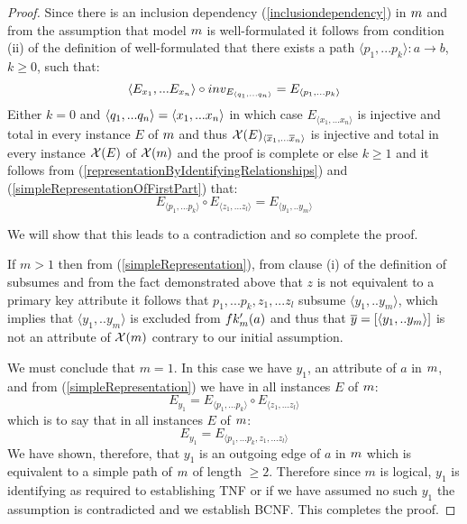 \begin{proof}
Since there is an inclusion dependency (\ref{inclusiondependency}) in ${m}$ and from the assumption that  model
${m}$ is well-formulated it follows
 from condition (ii) of the definition of well-formulated  that there exists
a path $\langle p_1,...p_k \rangle:a \rightarrow b$, $k \geq 0$, such that:
\begin{equation}
\label{simpleRepresentationOfFirstPart}
\langle E_{x_1},...E_{x_n} \rangle \circ inv_{E_{\langle q_1,...q_n\rangle}} = E_{\langle p_1,...p_k \rangle}
\end{equation}
\noindent Either $k=0$ and $\langle q_1,...q_n\rangle = \langle x_1,...x_n \rangle$ in which case $E_{\langle x_1,...x_n \rangle}$ is
injective and total in every instance $E$ of ${m}$ and thus $\mathcal{X}(E)_{\langle \overline{x}_1,...\overline{x}_n \rangle}$ is
injective and total in every instance $\mathcal{X}(E)$ of $\mathcal{X}({m})$ and the proof is complete 
\noindent or else $k \geq 1$ and it follows from (\ref{representationByIdentifyingRelationships}) and (\ref{simpleRepresentationOfFirstPart}) that:
\begin{equation} 
\label{simpleRepresentation}
 E_{\langle p_1,...p_k \rangle} \circ E_{\langle z_1,...z_l \rangle} = E_{\langle y_1,..y_m \rangle} 
\end{equation}


We will show that this leads to a contradiction and so complete the proof. 

If $m >1$ then
 from  (\ref{simpleRepresentation}),
from clause (i) of the definition of subsumes and from the fact demonstrated above that $z$ is not equivalent to a 
primary key attribute
it follows that $p_1,...p_k,z_1,...z_l$ subsume $\langle y_1,..y_m \rangle$, 
which implies that $\langle y_1,..y_m \rangle$ is excluded from $fk'_{{m}}(a)$ and thus that 
 $\overline{y}=\left[\langle y_1,..y_m \rangle\right]$ is not an attribute of $\mathcal{X}({m})$ contrary to our 
initial assumption. 

We must conclude that $m=1$.
In this case we have $y_1$, an attribute of $a$ in ${m}$, and from (\ref{simpleRepresentation})  we have in all instances $E$ of ${m}$:
\begin{equation}
E_{y_1}=E_{\langle p_1,...p_k \rangle} \circ E_{\langle z_1,...z_l \rangle}
\end{equation}
\noindent which is to say that in all instances $E$ of ${m}$:
\begin{equation}
E_{y_1}=E_{\langle p_1,...p_k ,z_1,...z_l \rangle}
\end{equation}
\noindent
We have shown, therefore, that $y_1$ is an outgoing edge of $a$ in ${m}$ 
which is equivalent to a simple path of ${m}$ of length $\geq 2$.
Therefore since $m$ is logical,  $y_1$ is identifying as required to establishing TNF
or if we have assumed no such $y_1$ the assumption is contradicted and we establish BCNF.
This completes the proof.
\end{proof}

